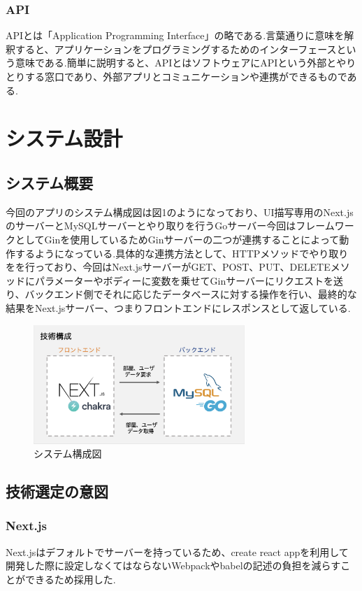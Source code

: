 \documentclass[submit,techrep]{ipsj}
\begin{document}
\subsubsection{API}
APIとは「Application Programming Interface」の略である.言葉通りに意味を解釈すると、アプリケーションをプログラミングするためのインターフェースという意味である.簡単に説明すると、APIとはソフトウェアにAPIという外部とやりとりする窓口であり、外部アプリとコミュニケーションや連携ができるものである.

\section{システム設計}

\subsection{システム概要}
今回のアプリのシステム構成図は図1のようになっており、UI描写専用のNext.jsのサーバーとMySQLサーバーとやり取りを行うGoサーバー今回はフレームワークとしてGinを使用しているためGinサーバーの二つが連携することによって動作するようになっている.具体的な連携方法として、HTTPメソッドでやり取りをを行っており、今回はNext.jsサーバーがGET、POST、PUT、DELETEメソッドにパラメーターやボディーに変数を乗せてGinサーバーにリクエストを送り、バックエンド側でそれに応じたデータベースに対する操作を行い、最終的な結果をNext.jsサーバー、つまりフロントエンドにレスポンスとして返している.

\begin{figure}[htbp]
  \centering
 \includegraphics[width=8cm]{./images/technical_configuration.jpg}
  \caption{システム構成図}
  \label{fig:sample}
\end{figure}

\subsection{技術選定の意図}
\subsubsection{Next.js}
Next.jsはデフォルトでサーバーを持っているため、create react appを利用して開発した際に設定しなくてはならないWebpackやbabelの記述の負担を減らすことができるため採用した.
\end{document}

